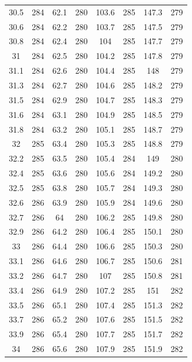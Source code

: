 \documentclass[12pt]{ctexart}
\numberwithin{equation}{section}
\begin{document}
\begin{longtable}{cc|cc|cc|cc}
30.5  &  284  &  62.1  &  280  &  103.6  &  285  &  147.3  &  279  \\
30.6  &  284  &  62.2  &  280  &  103.7  &  285  &  147.5  &  279  \\
30.8  &  284  &  62.4  &  280  &  104  &  285  &  147.7  &  279  \\
31  &  284  &  62.5  &  280  &  104.2  &  285  &  147.8  &  279  \\
31.1  &  284  &  62.6  &  280  &  104.4  &  285  &  148  &  279  \\
31.3  &  284  &  62.7  &  280  &  104.6  &  285  &  148.2  &  279  \\
31.5  &  284  &  62.9  &  280  &  104.7  &  285  &  148.3  &  279  \\
31.6  &  284  &  63.1  &  280  &  104.9  &  285  &  148.5  &  279  \\
31.8  &  284  &  63.2  &  280  &  105.1  &  285  &  148.7  &  279  \\
32  &  285  &  63.4  &  280  &  105.3  &  285  &  148.8  &  279  \\
32.2  &  285  &  63.5  &  280  &  105.4  &  284  &  149  &  280  \\
32.4  &  285  &  63.6  &  280  &  105.6  &  284  &  149.2  &  280  \\
32.5  &  285  &  63.8  &  280  &  105.7  &  284  &  149.3  &  280  \\
32.6  &  286  &  63.9  &  280  &  105.9  &  284  &  149.6  &  280  \\
32.7  &  286  &  64  &  280  &  106.2  &  285  &  149.8  &  280  \\
32.9  &  286  &  64.2  &  280  &  106.4  &  285  &  150.1  &  280  \\
33  &  286  &  64.4  &  280  &  106.6  &  285  &  150.3  &  280  \\
33.1  &  286  &  64.6  &  280  &  106.7  &  285  &  150.6  &  281  \\
33.2  &  286  &  64.7  &  280  &  107  &  285  &  150.8  &  281  \\
33.4  &  286  &  64.9  &  280  &  107.2  &  285  &  151  &  282  \\
33.5  &  286  &  65.1  &  280  &  107.4  &  285  &  151.3  &  282  \\
33.7  &  286  &  65.2  &  280  &  107.6  &  285  &  151.5  &  282  \\
33.9  &  286  &  65.4  &  280  &  107.7  &  285  &  151.7  &  282  \\
34  &  286  &  65.6  &  280  &  107.9  &  285  &  151.9  &  282  \\

\end{longtable}
\end{document}

